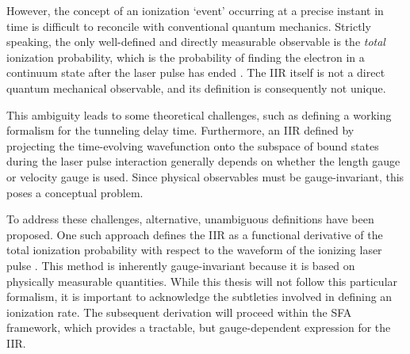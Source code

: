 However, the concept of an ionization `event' occurring at a precise instant in time is difficult to reconcile with conventional quantum mechanics. 
Strictly speaking, the only well-defined and directly measurable observable is the \emph{total} ionization probability, which is the probability of finding the electron in a continuum state after the laser pulse has ended \cite{Ivanov2018}. 
The IIR itself is not a direct quantum mechanical observable, and its definition is consequently not unique.

This ambiguity leads to some theoretical challenges, such as defining a working formalism for the tunneling delay time. 
Furthermore, an IIR defined by projecting the time-evolving wavefunction onto the subspace of bound states during the laser pulse interaction generally depends on whether the length gauge or velocity gauge is used. 
Since physical observables must be gauge-invariant, this poses a conceptual problem.

To address these challenges, alternative, unambiguous definitions have been proposed. 
One such approach defines the IIR as a functional derivative of the total ionization probability with respect to the waveform of the ionizing laser pulse \cite{Ivanov2018}. 
This method is inherently gauge-invariant because it is based on physically measurable quantities. 
While this thesis will not follow this particular formalism, it is important to acknowledge the subtleties involved in defining an ionization rate. 
The subsequent derivation will proceed within the SFA framework, which provides a tractable, but gauge-dependent expression for the IIR.




